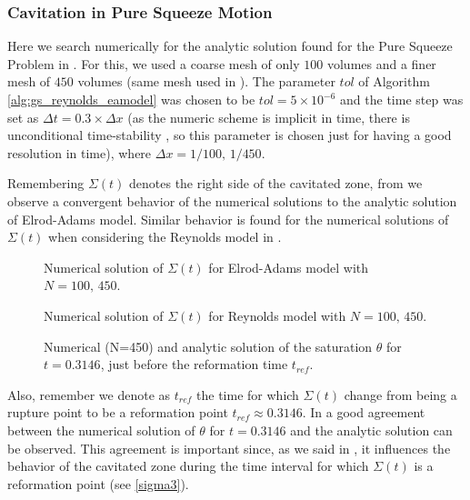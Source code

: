 \subsubsection*{Cavitation in Pure Squeeze Motion}
Here we search numerically for the analytic solution found for the Pure Squeeze Problem in . For this, we used a coarse mesh of only $100$ volumes and a finer mesh of $450$ volumes (same mesh used in \cite{ausas07}). The parameter $tol$ of Algorithm \ref{alg:gs_reynolds_eamodel} was chosen to be $tol=5\times 10^{-6}$ and the time step was set as $\Delta t = 0.3\times \Delta x$ (as the numeric scheme is implicit in time, there is unconditional time-stability \cite{leveque2007}, so this parameter is chosen just for having a good resolution in time), where $\Delta x = 1/100,\,1/450$. 

Remembering $\Sigma(t)$ denotes the right side of the cavitated zone, from  we observe a convergent behavior of the numerical solutions to the analytic solution of Elrod-Adams model. Similar behavior is found for the numerical solutions of $\Sigma(t)$ when considering the Reynolds model in .

\begin{figure}[ht]
\centering 
\def\svgwidth{\textwidth}\small{
}
\caption[Numerical solution of the cavitation boundary for Elrod-Adams model with $N=100,\,450$]
{Numerical solution of $\Sigma(t)$ for Elrod-Adams model with $N=100,\,450$.
}\label{fig:ea_sigma_convergence}
\end{figure}

\begin{figure}[ht]
\centering 
\def\svgwidth{\textwidth}\small{
}
\caption[Numerical solution of the cavitation boundary for Reynolds model with $N=100,\,450$]{
Numerical solution of $\Sigma(t)$ for Reynolds model with $N=100,\,450$.
}\label{fig:re_sigma_convergence}
\end{figure}

\begin{figure}[ht]
\centering 
\def\svgwidth{\textwidth}\small{
}\caption{
Numerical (N=450) and analytic solution of the saturation $\theta$ for $t=0.3146$, just before the reformation time $t_{ref}$.
}\label{fig:theta_trup}
\end{figure}

Also, remember we denote as $t_{ref}$ the time for which $\Sigma(t)$ change from being a rupture point to be a reformation point $t_{ref}\approx 0.3146$. In  a good agreement between the numerical solution of $\theta$ for $t=0.3146$ and the analytic solution can be observed. This agreement is important since, as we said in , it influences the behavior of the cavitated zone during the time interval for which $\Sigma(t)$ is a reformation point (see \eqref{sigma3}).

